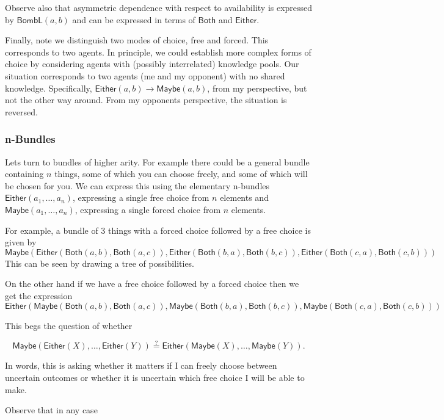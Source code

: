\documentclass[12pt]{article}
\theoremstyle{definition}
\theoremstyle{plain}
\theoremstyle{plain}
\theoremstyle{plain}
\theoremstyle{plain}
\theoremstyle{remark}
\theoremstyle{remark}
\begin{document}
Observe also that asymmetric dependence with respect to availability is expressed by $\mathsf{BombL}(a,b)$ and can be expressed in terms of $\mathsf{Both}$ and $\mathsf{Either}$.

Finally, note we distinguish two modes of choice, free and forced. This corresponds to two agents. In principle, we could establish more complex forms of choice by considering agents with (possibly interrelated) knowledge pools. Our situation corresponds to two agents (me and my opponent) with no shared knowledge. Specifically, $\mathsf{Either}(a,b) \rightarrow \mathsf{Maybe}(a,b)$, from my perspective, but not the other way around. From my opponents perspective, the situation is reversed.   

\subsubsection{n-Bundles}
Lets turn to bundles of higher arity. For example there could be a general bundle containing $n$ things, some of which you can choose freely, and some of which will be chosen for you. We can express this using the elementary n-bundles $\mathsf{Either}(a_1,\ldots,a_n)$, expressing a single free choice from $n$ elements and $\mathsf{Maybe}(a_1,\ldots,a_n)$, expressing a single forced choice from $n$ elements. 

For example, a bundle of 3 things with a forced choice followed by a free choice is given by 
\[\mathsf{Maybe}( \mathsf{Either}(\mathsf{Both}(a,b), \mathsf{Both}(a,c)), \mathsf{Either}(\mathsf{Both}(b,a), \mathsf{Both}(b,c)), \mathsf{Either}(\mathsf{Both}(c,a), \mathsf{Both}(c,b)))\]
This can be seen by drawing a tree of possibilities.

On the other hand if we have a free choice followed by a forced choice then we get the expression
\[\mathsf{Either}( 
\mathsf{Maybe}(\mathsf{Both}(a,b), \mathsf{Both}(a,c)), 
\mathsf{Maybe}(\mathsf{Both}(b,a), \mathsf{Both}(b,c)),
\mathsf{Maybe}(\mathsf{Both}(c,a), \mathsf{Both}(c,b))
)
\]

This begs the question of whether

\[\mathsf{Maybe}( \mathsf{Either}(X), \ldots, \mathsf{Either}(Y)) \stackrel{?}{=} \mathsf{Either}( \mathsf{Maybe}(X), \ldots, \mathsf{Maybe}(Y)). 
\]

In words, this is asking whether it matters if I can freely choose between uncertain outcomes or whether it is uncertain which free choice I will be able to make.  

Observe that in any case
\end{document}
